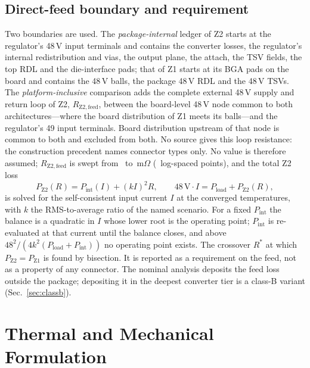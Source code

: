 \documentclass[journal]{IEEEtran}
\begin{document}
\subsection{Direct-feed boundary and requirement}\label{sec:directfeed}
Two boundaries are used. The \emph{package-internal} ledger of Z2 starts at the regulator's 48\,V
input terminals and contains the converter losses, the regulator's internal redistribution and
vias, the output plane, the attach, the TSV fields, the top RDL and the die-interface pads; that
of Z1 starts at its BGA pads on the board and contains the 48\,V balls, the package 48\,V RDL and
the 48\,V TSVs. The \emph{platform-inclusive} comparison adds the complete external 48\,V supply
and return loop of Z2, $R_{\mathrm{Z2,feed}}$, between the board-level 48\,V node common to both
architectures---where the board distribution of Z1 meets its balls---and the regulator's 49 input
terminals. Board distribution upstream of that node is common to both and excluded from both. No
source gives this loop resistance: the construction precedent names connector types only. No
value is therefore assumed; $R_{\mathrm{Z2,feed}}$ is swept from \FeedSweepLo\ to
\FeedSweepHi\,m$\Omega$ (\FeedSweepN\ log-spaced points), and the total Z2 loss
\begin{equation}
P_{\mathrm{Z2}}(R) = P_{\mathrm{int}}(I) + (k I)^{2} R,\qquad
48\,\mathrm{V}\cdot I = P_{\mathrm{load}} + P_{\mathrm{Z2}}(R),
\label{eq:feed}
\end{equation}
is solved for the self-consistent input current $I$ at the converged temperatures, with $k$ the
RMS-to-average ratio of the named scenario. For a fixed $P_{\mathrm{int}}$ the balance is a
quadratic in $I$ whose lower root is the operating point; $P_{\mathrm{int}}$ is re-evaluated at
that current until the balance closes, and above
$48^{2}/(4k^{2}(P_{\mathrm{load}}+P_{\mathrm{int}}))$ no operating point exists.
The crossover $R^{*}$ at which $P_{\mathrm{Z2}} = P_{\mathrm{Z1}}$ is found by bisection. It is
reported as a requirement on the feed, not as a property of any connector. The nominal analysis
deposits the feed loss outside the package; depositing it in the deepest converter tier is a
class-B variant (Sec.~\ref{sec:classb}).
\section{Thermal and Mechanical Formulation}\label{sec:thermech}
\end{document}
